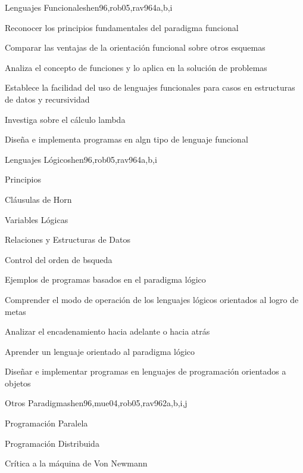 \begin{syllabus}
\begin{unit}{Lenguajes Funcionales}{hen96,rob05,rav96}{4}{a,b,i}
   \begin{unitgoals}
      \item Reconocer los principios fundamentales del paradigma
      funcional
      \item Comparar las ventajas de la orientación funcional sobre
      otros esquemas
      \item Analiza el concepto de funciones y lo aplica en la
      solución de problemas
      \item Establece la facilidad del uso de lenguajes funcionales
      para casos en estructuras de datos y recursividad
      \item Investiga sobre el cálculo lambda
      \item Diseña e implementa programas en algn tipo de lenguaje
      funcional
   \end{unitgoals}
\end{unit}

\begin{unit}{Lenguajes Lógicos}{hen96,rob05,rav96}{4}{a,b,i}
\begin{topics}
      \item Principios
      \item Cláusulas de Horn
      \item Variables Lógicas
      \item Relaciones y Estructuras de Datos
      \item Control del orden de bsqueda
      \item Ejemplos de programas basados en el paradigma lógico

   \end{topics}

   \begin{unitgoals}
      \item Comprender el modo de operación de los lenguajes lógicos
      orientados al logro de metas
      \item Analizar el encadenamiento hacia adelante o hacia atrás
      \item Aprender un lenguaje orientado al paradigma lógico
      \item Diseñar e implementar programas en lenguajes de
      programación orientados a objetos
   \end{unitgoals}
\end{unit}

\begin{unit}{Otros Paradigmas}{hen96,mue04,rob05,rav96}{2}{a,b,i,j}
\begin{topics}
      \item Programación Paralela
      \item Programación Distribuida
      \item Crítica a la máquina de Von Newmann
   \end{topics}


\end{unit}
\end{syllabus}
